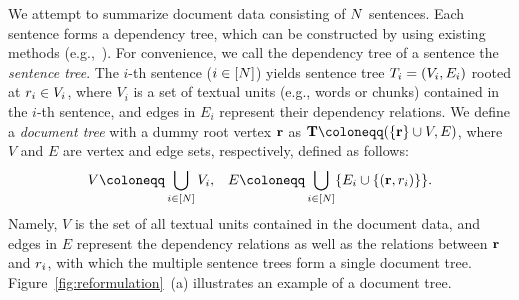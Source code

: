 \documentclass[11pt,a4paper]{article}
\begin{document}
	We attempt to summarize document data consisting of $N$ sentences. 
	Each sentence forms a dependency tree, 
	which can be constructed by using existing methods
	(e.g.,~\cite{filippova08,filippova2013overcoming}). 
	For convenience, we call 
	the dependency tree of a sentence the {\it sentence tree}.   
	The $i$-th sentence ($i\in [N]$)
	yields sentence tree ${T}_i=(V_i,E_i)$ rooted at $r_i\in V_i$, 
	where $V_i$ is a set of textual units (e.g., words or chunks) 
	contained in the $i$-th sentence, 
	and edges in $E_i$ represent their dependency relations. 
	We define a {\it document tree} with a dummy root vertex ${\bf r}$ as 
	$\Td\coloneqq (\{\rd\}\cup V, E)$, where $V$ and $E$ are 
	vertex and edge sets, respectively, defined as follows: 
	\begin{align*}
		V\coloneqq \bigcup_{i\in[\ns]} V_i, & &
		E\coloneqq \bigcup_{i\in[\ns]}\{E_i\cup\{(\rd,\rs_i) \} \}. 
	\end{align*}
	Namely, $V$ is the set of all textual units contained in the document data, 
	and edges in $E$ represent the dependency relations  
	as well as the relations between ${\bf r}$ and $r_i$, 
	with which the multiple sentence trees form a single document tree. 
	Figure~\ref{fig:reformulation}~(a) illustrates 
	an example of a document tree. 
	
\end{document}

